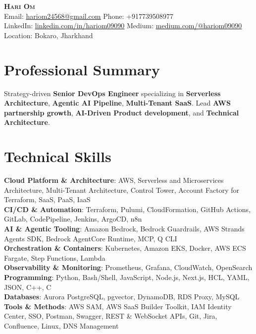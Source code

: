 \documentclass[letterpaper,11pt]{article}
\begin{document}
\begin{center}
  {\Huge \scshape \textbf{Hari Om}} \\[6pt]
  \small Email: \href{mailto:hariom24568@gmail.com}{\underline{hariom24568@gmail.com}}
  \quad\textbar\quad Phone: +917739508977 \\[4pt]
  \small LinkedIn: \href{https://linkedin.com/in/hariom09090}{\underline{linkedin.com/in/hariom09090}}
  \quad\textbar\quad
  Medium: \href{https://medium.com/@hariom09090}{\underline{medium.com/@hariom09090}}
  \quad\textbar\quad
  \small Location: Bokaro, Jharkhand
\end{center}
\vspace{-8pt}


\section{Professional Summary}
\small{Strategy-driven \textbf{Senior DevOps Engineer} specializing in \textbf{Serverless Architecture}, \textbf{Agentic AI Pipeline}, \textbf{Multi-Tenant SaaS}. Lead \textbf{AWS partnership growth}, \textbf{AI-Driven Product development}, and \textbf{Technical Architecture}.}
\vspace{-2pt}

 \section{Technical Skills}
 \begin{itemize}[leftmargin=0.15in, label={}]
    \small{\item{
     \textbf{Cloud Platform \& Architecture}{: AWS, Serverless and Microservices Architecture, Multi-Tenant Architecture, Control Tower, Account Factory for Terraform, SaaS, PaaS, IaaS} \\
     \textbf{CI/CD \& Automation}{: Terraform, Pulumi, CloudFormation, GitHub Actions, GitLab, CodePipeline, Jenkins, ArgoCD, n8n} \\
     \textbf{AI \& Agentic Tooling}{: Amazon Bedrock, Bedrock Guardrails, AWS Strands Agents SDK, Bedrock AgentCore Runtime, MCP, Q CLI} \\
     \textbf{Orchestration \& Containers}{: Kubernetes, Amazon EKS, Docker, AWS ECS Fargate, Step Functions, Lambda} \\
     \textbf{Observability \& Monitoring}{: Prometheus, Grafana, CloudWatch, OpenSearch} \\
     \textbf{Programming}{: Python, Bash/Shell, JavaScript, Node.js, Next.js, HCL, YAML, JSON, C++, C} \\
     \textbf{Databases}{: Aurora PostgreSQL, pgvector, DynamoDB, RDS Proxy, MySQL} \\
     \textbf{Tools \& Methods}{: AWS SAM, AWS SaaS Builder Toolkit, IAM Identity Center, SSO, Postman, Swagger, REST \& WebSocket APIs, Git, Jira, Confluence, Linux, DNS Management}
    }}
 \end{itemize}
 \vspace{-8pt}
 
\end{document}
